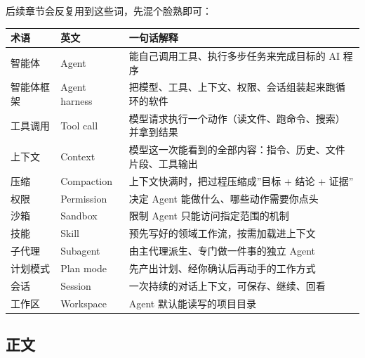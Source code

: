 \documentclass[
]{article}
\newcounter{none} %
\begin{document}
后续章节会反复用到这些词，先混个脸熟即可：

{\def\LTcaptype{none} %
\begin{longtable}[]{@{}
  >{\raggedright\arraybackslash}p{}
  >{\raggedright\arraybackslash}p{}
  >{\raggedright\arraybackslash}p{}@{}}
\toprule\noalign{}
\begin{minipage}[b]{\linewidth}\raggedright
术语
\end{minipage} & \begin{minipage}[b]{\linewidth}\raggedright
英文
\end{minipage} & \begin{minipage}[b]{\linewidth}\raggedright
一句话解释
\end{minipage} \\
\midrule\noalign{}
\endhead
\bottomrule\noalign{}
\endlastfoot
智能体 & Agent & 能自己调用工具、执行多步任务来完成目标的 AI 程序 \\
智能体框架 & Agent harness &
把模型、工具、上下文、权限、会话组装起来跑循环的软件 \\
工具调用 & Tool call &
模型请求执行一个动作（读文件、跑命令、搜索）并拿到结果 \\
上下文 & Context &
模型这一次能看到的全部内容：指令、历史、文件片段、工具输出 \\
压缩 & Compaction & 上下文快满时，把过程压缩成''目标 + 结论 + 证据'' \\
权限 & Permission & 决定 Agent 能做什么、哪些动作需要你点头 \\
沙箱 & Sandbox & 限制 Agent 只能访问指定范围的机制 \\
技能 & Skill & 预先写好的领域工作流，按需加载进上下文 \\
子代理 & Subagent & 由主代理派生、专门做一件事的独立 Agent \\
计划模式 & Plan mode & 先产出计划、经你确认后再动手的工作方式 \\
会话 & Session & 一次持续的对话上下文，可保存、继续、回看 \\
工作区 & Workspace & Agent 默认能读写的项目目录 \\
\end{longtable}
}

\subsection{正文}\label{ux6b63ux6587}
\end{document}

